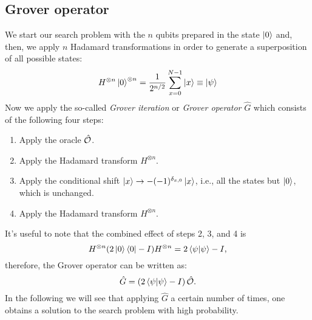 \documentclass[a4paper,draft]{article}
\begin{document}
\subsection{Grover operator}
We start our search problem with the $n$ qubits prepared in the state $\ket{0}$ and, then, we apply $n$ Hadamard transformations in order to generate a superposition of all possible states:
\begin{equation}
  H^{\otimes n}\ket{0}^{\otimes n}
  = \frac{1}{2^{n/2}}\sum_{x=0}^{N-1}\ket{x}\equiv\ket{\psi}
\end{equation}
Now we apply the so-called \textit{Grover iteration} or \textit{Grover operator} $\hat{G}$ which consists of the following four steps:
\begin{enumerate}
  \item Apply the oracle $\hat{\mathcal{O}}$.
  \item Apply the Hadamard transform $H^{\otimes n}$.
  \item Apply the conditional shift $\ket{x}\rightarrow-(-1)^{\delta_{x,0}}\ket{x}$, i.e., all the states but $\ket{0}$, which is unchanged.
  \item Apply the Hadamard transform $H^{\otimes n}$.
\end{enumerate}
It's useful to note that the combined effect of steps 2, 3, and 4 is
\begin{equation}
  H^{\otimes n}(2\ket{0}\bra{0}-I)H^{\otimes n}=
  2\bra{\psi}\ket{\psi}-I,
\end{equation}
therefore, the Grover operator can be written as:
\begin{equation}
  \hat{G}=\left(2\bra{\psi}\ket{\psi}-I\right)\hat{\mathcal{O}}.
\end{equation}
In the following we will see that applying $\hat{G}$ a certain number of times, one obtains a solution to the search problem with high probability.
\end{document}
